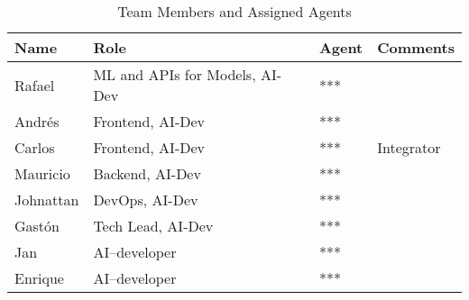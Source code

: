 \documentclass{article}
\begin{document}
\begin{table}[h]
\centering
\begin{tabular}{|>{\raggedright\arraybackslash}p{}|>{\raggedright\arraybackslash}p{}|>{\raggedright\arraybackslash}p{}|>{\raggedright\arraybackslash}p{}|}
\hline
\textbf{Name} & \textbf{Role} & \textbf{Agent} & \textbf{Comments} \\ \hline
Rafael & ML and APIs for Models, AI-Dev & *** &  \\ \hline
Andrés & Frontend, AI-Dev & *** &  \\ \hline
Carlos & Frontend, AI-Dev & *** & Integrator \\ \hline
Mauricio & Backend, AI-Dev & *** &  \\ \hline
Johnattan & DevOps, AI-Dev & *** &  \\ \hline
Gastón & Tech Lead, AI-Dev & *** &  \\ \hline
Jan & AI--developer & *** &  \\ \hline
Enrique & AI--developer & *** &  \\ \hline
\end{tabular}
\caption{Team Members and Assigned Agents}
\end{table}
\end{document}
